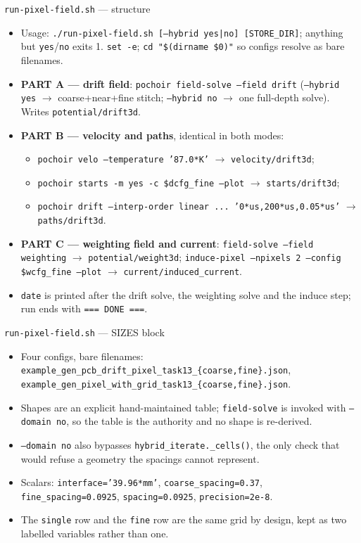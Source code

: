 \documentclass[10pt,aspectratio=169]{beamer}
\newcommand{\ti}[1]{\texttt{\footnotesize #1}}
\begin{document}
\begin{frame}[allowframebreaks]{\texttt{run-pixel-field.sh} --- structure}
  \begin{itemize}\small
  \item Usage: \ti{./run-pixel-field.sh [--hybrid yes|no] [STORE\_DIR]};
        anything but \ti{yes}/\ti{no} exits 1. \ti{set -e}; \ti{cd "\$(dirname \$0)"} so
        configs resolve as bare filenames.
  \item \textbf{PART A --- drift field}: \ti{pochoir field-solve --field drift}
        (\ti{--hybrid yes} $\rightarrow$ coarse+near+fine stitch; \ti{--hybrid no}
        $\rightarrow$ one full-depth solve). Writes \ti{potential/drift3d}.
  \item \textbf{PART B --- velocity and paths}, identical in both modes:
    \begin{itemize}
    \item \ti{pochoir velo --temperature '87.0*K'} $\rightarrow$ \ti{velocity/drift3d};
    \item \ti{pochoir starts -m yes -c \$dcfg\_fine --plot} $\rightarrow$ \ti{starts/drift3d};
    \item \ti{pochoir drift --interp-order linear ... '0*us,200*us,0.05*us'}
          $\rightarrow$ \ti{paths/drift3d}.
    \end{itemize}
  \item \textbf{PART C --- weighting field and current}:
        \ti{field-solve --field weighting} $\rightarrow$ \ti{potential/weight3d};
        \ti{induce-pixel --npixels 2 --config \$wcfg\_fine --plot} $\rightarrow$
        \ti{current/induced\_current}.
  \item \ti{date} is printed after the drift solve, the weighting solve and the induce
        step; run ends with \ti{=== DONE ===}.
  \end{itemize}
\end{frame}

\begin{frame}{\texttt{run-pixel-field.sh} --- SIZES block}
  \begin{itemize}\small
  \item Four configs, bare filenames: \ti{example\_gen\_pcb\_drift\_pixel\_task13\_\{coarse,fine\}.json},
        \ti{example\_gen\_pixel\_with\_grid\_task13\_\{coarse,fine\}.json}.
  \item Shapes are an explicit hand-maintained table; \ti{field-solve} is invoked with
        \ti{--domain no}, so the table is the authority and no shape is re-derived.
  \item \ti{--domain no} also bypasses \ti{hybrid\_iterate.\_cells()}, the only check that
        would refuse a geometry the spacings cannot represent.
  \item Scalars: \ti{interface='39.96*mm'}, \ti{coarse\_spacing=0.37},
        \ti{fine\_spacing=0.0925}, \ti{spacing=0.0925}, \ti{precision=2e-8}.
  \item The \ti{single} row and the \ti{fine} row are the same grid by design, kept as two
        labelled variables rather than one.
  \end{itemize}
\end{frame}
\end{document}
